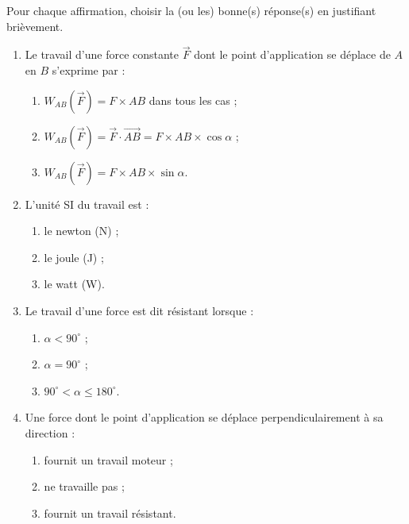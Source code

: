 \documentclass[11pt]{article}
\newcommand{\cle}[1]{{\popxbold\color{popdark}#1}}
\begin{document}
\begin{exercice}
Pour chaque affirmation, choisir la (ou les) bonne(s) réponse(s) en justifiant brièvement.
\begin{enumerate}
\item Le travail d'une force constante $\vec{F}$ dont le point d'application se déplace de $A$ en $B$ s'exprime par :
\begin{enumerate}
\item $W_{AB}(\vec{F}) = F \times AB$ dans tous les cas ;
\item $W_{AB}(\vec{F}) = \vec{F} \cdot \overrightarrow{AB} = F \times AB \times \cos\alpha$ ;
\item $W_{AB}(\vec{F}) = F \times AB \times \sin\alpha$.
\end{enumerate}
\item L'unité SI du travail est :
\begin{enumerate}
\item le newton (N) ; \item le joule (J) ; \item le watt (W).
\end{enumerate}
\item Le travail d'une force est dit \cle{résistant} lorsque :
\begin{enumerate}
\item $\alpha < 90^{\circ}$ ; \item $\alpha = 90^{\circ}$ ; \item $90^{\circ} < \alpha \leq 180^{\circ}$.
\end{enumerate}
\item Une force dont le point d'application se déplace perpendiculairement à sa direction :
\begin{enumerate}
\item fournit un travail moteur ; \item ne travaille pas ; \item fournit un travail résistant.
\end{enumerate}
\end{enumerate}
\end{exercice}
\end{document}
